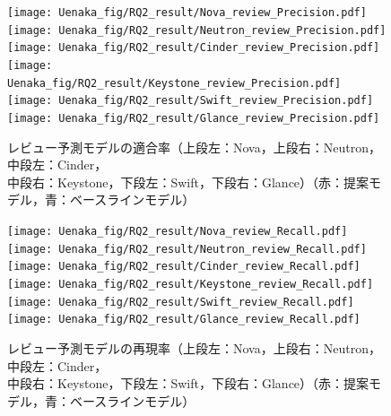 \documentclass[submit]{ipsj}
\begin{document}
\clearpage
\begin{figure}[H]
\begin{minipage}{\textwidth}
\vspace{0.08\textheight}
\begin{center}
    \texttt{[image: Uenaka\_fig/RQ2\_result/Nova\_review\_Precision.pdf]}
    \texttt{[image: Uenaka\_fig/RQ2\_result/Neutron\_review\_Precision.pdf]}
    \texttt{[image: Uenaka\_fig/RQ2\_result/Cinder\_review\_Precision.pdf]}
    \texttt{[image: Uenaka\_fig/RQ2\_result/Keystone\_review\_Precision.pdf]}
    \texttt{[image: Uenaka\_fig/RQ2\_result/Swift\_review\_Precision.pdf]}
    \texttt{[image: Uenaka\_fig/RQ2\_result/Glance\_review\_Precision.pdf]}
    \caption{レビュー予測モデルの適合率（上段左：Nova，上段右：Neutron，中段左：Cinder，\\ 中段右：Keystone，下段左：Swift，下段右：Glance）（赤：提案モデル，青：ベースラインモデル）}
    \label{fig:review_p}
\end{center}
\vspace{0.08\textheight}
\end{minipage}
\end{figure}

\begin{figure}[H]
\begin{minipage}{\textwidth}
\vspace{0.08\textheight}
\begin{center}
    \texttt{[image: Uenaka\_fig/RQ2\_result/Nova\_review\_Recall.pdf]}
    \texttt{[image: Uenaka\_fig/RQ2\_result/Neutron\_review\_Recall.pdf]}
    \texttt{[image: Uenaka\_fig/RQ2\_result/Cinder\_review\_Recall.pdf]}
    \texttt{[image: Uenaka\_fig/RQ2\_result/Keystone\_review\_Recall.pdf]}
    \texttt{[image: Uenaka\_fig/RQ2\_result/Swift\_review\_Recall.pdf]}
    \texttt{[image: Uenaka\_fig/RQ2\_result/Glance\_review\_Recall.pdf]}
    \caption{レビュー予測モデルの再現率（上段左：Nova，上段右：Neutron，中段左：Cinder，\\ 中段右：Keystone，下段左：Swift，下段右：Glance）（赤：提案モデル，青：ベースラインモデル）}
    \label{fig:review_r}
\end{center}
\vspace{0.08\textheight}
\end{minipage}
\end{figure}
\end{document}
